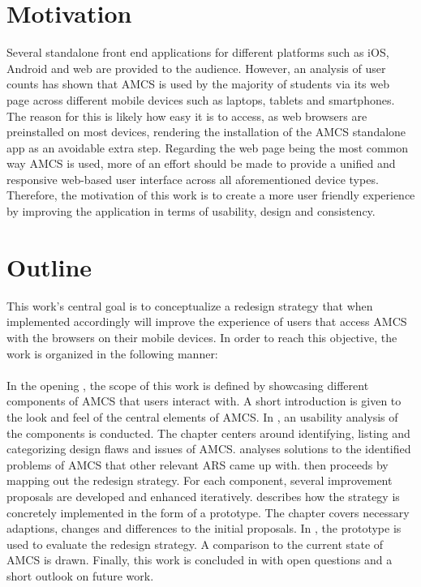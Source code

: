 \section{Motivation}
Several standalone front end applications for different platforms such as iOS, Android and web are provided to the audience. However, an analysis of user counts has shown that AMCS is used by the majority of students via its web page across different mobile devices such as laptops, tablets and smartphones.
The reason for this is likely how easy it is to access, as web browsers are preinstalled on most devices, rendering the installation of the AMCS standalone app as an avoidable extra step.
\newline
\newline 
Regarding the web page being the most common way AMCS is used, more of an effort should be made to provide a unified and responsive web-based user interface across all aforementioned device types.
\newline
\newline 
Therefore, the motivation of this work is to create a more user friendly experience by improving the application in terms of usability, design and consistency.
\section{Outline}
\label{section:intro:objective}
This work's central goal is to conceptualize a redesign strategy that when implemented accordingly will improve the experience of users that access AMCS with the browsers on their mobile devices. In order to reach this objective, the work is organized in the following manner:
\\
\\
In the opening , the scope of this work is defined by showcasing different components of AMCS that users interact with. A short introduction is given to the look and feel of the central elements of AMCS.
In , an usability analysis of the components is conducted. The chapter centers around identifying, listing and categorizing design flaws and issues of AMCS. 
 analyses solutions to the identified problems of AMCS that other relevant ARS came up with.
 then proceeds by mapping out the redesign strategy. For each component, several improvement proposals are developed and enhanced iteratively. 
 describes how the strategy is concretely implemented in the form of a prototype. The chapter covers necessary adaptions, changes and differences to the initial proposals.
In , the prototype is used to evaluate the redesign strategy. A comparison to the current state of AMCS is drawn.
Finally, this work is concluded in  with open questions and a short outlook on future work.